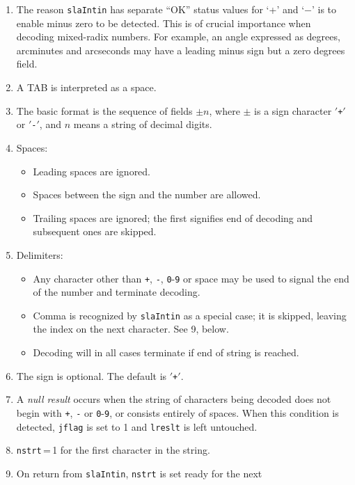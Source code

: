 \documentclass[11pt,fleqn,twoside]{article}
\renewcommand{\_}{{\tt\char'137}}     %
\newcommand{\fstring}[1]{\hspace{0.05em}\mbox{$'${\tt#1}\hspace{0.09em}$'$}}
\begin{document}
{
 \begin{enumerate}
 \item The reason {\tt slaIntin} has separate ``OK'' status values
       for `+' and `$-$'
       is to enable minus zero to be detected.
       This is of crucial importance
       when decoding mixed-radix numbers.  For example, an angle
       expressed as degrees, arcminutes and arcseconds may have a
       leading minus sign but a zero degrees field.
 \item A TAB is interpreted as a space.
 \item The basic format is the sequence of fields $\pm n$,
       where $\pm$ is a sign
       character \fstring{+} or \fstring{-}, and $n$ means a string of decimal digits.
 \item Spaces:
       \begin{itemize}
       \item Leading spaces are ignored.
       \item Spaces between the sign and the number are allowed.
       \item Trailing spaces are ignored;  the first signifies
             end of decoding and subsequent ones are skipped.
       \end{itemize}
 \item Delimiters:
       \begin{itemize}
       \item Any character other than
             {\tt +},
             {\tt -},
             {\tt 0}-{\tt 9} or space may be
             used to signal the end of the number and terminate decoding.
       \item Comma is recognized by {\tt slaIntin} as a special case; it
             is skipped, leaving the index on the next character.  See
             9, below.
       \item Decoding will in all cases terminate if end of string
             is reached.
       \end{itemize}
 \item The sign is optional.  The default is \fstring{+}.
 \item A {\it null result}\/ occurs when the string of characters
       being decoded does not begin with
       {\tt +},
       {\tt -} or
       {\tt 0}-{\tt 9}, or
       consists entirely of spaces.  When this condition is
       detected, {\tt jflag} is set to 1 and {\tt lreslt} is left untouched.
 \item {\tt nstrt}\,=\,1 for the first character in the string.
 \item On return from {\tt slaIntin}, {\tt nstrt} is set ready for the next

\end{enumerate}}
\end{document}
